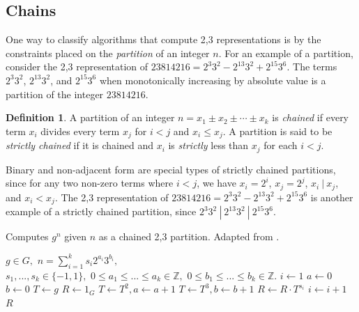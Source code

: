 \documentclass{ucalgthes1}
\theoremstyle{definition}
\newtheorem{defn}[thm]{Definition}
\newcommand{\ZZ}{\mathbb{Z}}
\begin{document}
\bigbreak
\subsection{Chains}

One way to classify algorithms that compute 2,3 representations is by the constraints placed on the \emph{partition} of an integer $n$.  For an example of a partition, consider the 2,3 representation of $23814216 = 2^3 3^2 -2^{13} 3^2 +2^{15} 3^6$.  The terms $2^3 3^2$, $2^{13} 3^2$, and $2^{15} 3^6$ when monotonically increasing by absolute value is a partition of the integer $23814216$.  

\begin{defn}
A partition of an integer $n = x_1 \pm x_2 \pm \cdots \pm x_k$ is \emph{chained} if every term $x_i$ divides every term $x_j$ for $i < j$ and $x_i \le x_j$. A partition is said to be \emph{strictly chained} if it is chained and $x_i$ is \emph{strictly} less than $x_j$ for each $i < j$.
\end{defn}

\noindent
Binary and non-adjacent form are special types of strictly chained partitions, since for any two non-zero terms where $i < j$, we have $x_i = 2^i$, $x_j = 2^j$, $ x_i ~|~ x_j$, and $x_i < x_j$.  The 2,3 representation of $23814216 = 2^3 3^2 - 2^{13} 3^2 + 2^{15} 3^6$ is another example of a strictly chained partition, since $2^3 3^2 ~|~ 2^{13} 3^2 ~|~ 2^{15} 3^6$.

\begin{algorithm}[h]
\caption{Computes $g^n$ given $n$ as a chained 2,3 partition. Adapted from \cite{Dimitrov2005}.}
\label{alg:expWithChain}
\begin{algorithmic}[1]
\REQUIRE $g \in G,$ 
$n = \sum_{i=1}^k s_i2^{a_i}3^{b_i},$ \\
$s_1,...,s_k \in \{-1, 1\},$ 
$0 \le a_1 \le ...\le a_k \in \ZZ,$ 
$0 \le b_1 \le ... \le b_k \in \ZZ.$
\STATE $i \gets 1$
\STATE $a \gets 0$ 
\STATE $b \gets 0$ 
\STATE $T \gets g$ 
\STATE $R \gets 1_G$
		\STATE $T \gets T^2, a \gets a + 1$
	\ENDWHILE
		\STATE $T \gets T^3, b \gets b + 1$
	\ENDWHILE
	\STATE $R \gets R \cdot T^{s_i}$ 
	\STATE $i \gets i + 1$
\ENDWHILE
\RETURN $R$
\end{algorithmic}
\end{algorithm}
\end{document}
